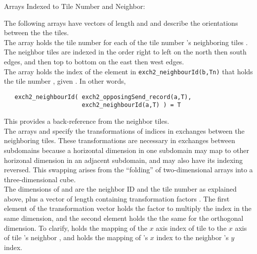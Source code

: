 Arrays Indexed to Tile Number and Neighbor:

The following arrays have vectors of length  and
 and describe the orientations between the the tiles. \\

The array  holds the tile number
 for each of the tile number 's neighboring tiles
.  The neighbor tiles are indexed
 in the order right to left on the
north then south edges, and then top to bottom on the east then west
edges.  \\

 The  array holds the
index  of the element in \texttt{exch2\_neighbourId(b,Tn)}
that holds the tile number , given
.  In other words,
\begin{verbatim}
   exch2_neighbourId( exch2_opposingSend_record(a,T),
                      exch2_neighbourId(a,T) ) = T
\end{verbatim}
This provides a back-reference from the neighbor tiles. \\

The arrays  and
 specify the transformations of indices
in exchanges between the neighboring tiles.  These transformations are
necessary in exchanges between subdomains because a horizontal dimension 
in one subdomain 
may map to other horizonal dimension in an adjacent subdomain, and
may also have its indexing reversed. This swapping arises from the
``folding'' of two-dimensional arrays into a three-dimensional
cube. \\

The dimensions of  and 
are the neighbor ID  and the tile number  as explained
above, plus a vector of length  containing transformation
factors .  The first element of the transformation vector
holds the factor to multiply the index in the same dimension, and the
second element holds the the same for the orthogonal dimension.  To
clarify,  holds the mapping of the $x$ axis
index of tile  to the $x$ axis of tile 's neighbor
, and  holds the mapping of 's
$x$ index to the neighbor 's $y$ index. \\
 
